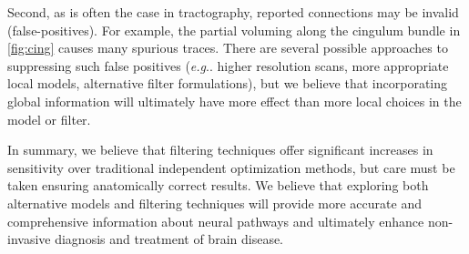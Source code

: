 \documentclass[final,hyperref]{gatech-thesis}
\makeatletter
\DeclareRobustCommand\onedot{\futurelet\@let@token\@onedot}
\def\@onedot{\ifx\@let@token.\else.\null\fi\xspace}
\newcommand{\eg}{\textit{e.g}\onedot}
\makeatother
\begin{document}
Second, as is often the case in tractography, reported connections may be
invalid (false-positives).  For example, the partial voluming along the
cingulum bundle in \autoref{fig:cing} causes many spurious traces.  There are
several possible approaches to suppressing such false positives (\eg higher
resolution scans, more appropriate local models, alternative filter
formulations), but we believe that incorporating global information will
ultimately have more effect than more local choices in the model or filter.

In summary, we believe that filtering techniques offer significant increases
in sensitivity over traditional independent optimization methods, but care
must be taken ensuring anatomically correct results.  We believe that
exploring both alternative models and filtering techniques will provide more
accurate and comprehensive information about neural pathways and ultimately
enhance non-invasive diagnosis and treatment of brain disease.



\begin{postliminary}
\end{postliminary}
\end{document}
